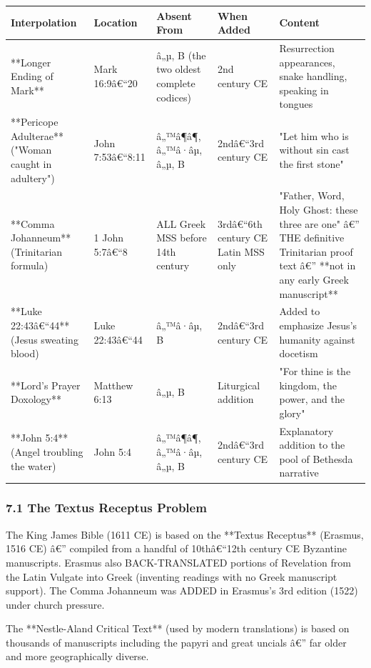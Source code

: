\documentclass[aps,prd,11pt,onecolumn,superscriptaddress,nofootinbib,floatfix]{revtex4-2}
\begin{document}
\begin{table}[h!]
\centering
\begin{tabular}{p{3cm}p{3cm}p{3cm}p{3cm}p{3cm}}
\hline
Interpolation & Location & Absent From & When Added & Content \\
\hline
**Longer Ending of Mark** & Mark 16:9â€``20 & â„µ, B (the two oldest complete codices) & 2nd century CE & Resurrection appearances, snake handling, speaking in tongues \\
**Pericope Adulterae** ("Woman caught in adultery") & John 7:53â€``8:11 & â„™â¶â¶, â„™â·âµ, â„µ, B & 2ndâ€``3rd century CE & "Let him who is without sin cast the first stone" \\
**Comma Johanneum** (Trinitarian formula) & 1 John 5:7â€``8 & ALL Greek MSS before 14th century & 3rdâ€``6th century CE Latin MSS only & "Father, Word, Holy Ghost: these three are one" â€'' THE definitive Trinitarian proof text â€'' **not in any early Greek manuscript** \\
**Luke 22:43â€``44** (Jesus sweating blood) & Luke 22:43â€``44 & â„™â·âµ, B & 2ndâ€``3rd century CE & Added to emphasize Jesus's humanity against docetism \\
**Lord's Prayer Doxology** & Matthew 6:13 & â„µ, B & Liturgical addition & "For thine is the kingdom, the power, and the glory" \\
**John 5:4** (Angel troubling the water) & John 5:4 & â„™â¶â¶, â„™â·âµ, â„µ, B & 2ndâ€``3rd century CE & Explanatory addition to the pool of Bethesda narrative \\
\hline
\end{tabular}
\end{table}



\subsubsection{7.1 The Textus Receptus Problem}


The King James Bible (1611 CE) is based on the **Textus Receptus** (Erasmus, 1516 CE) â€'' compiled from a handful of 10thâ€``12th century CE Byzantine manuscripts. Erasmus also BACK-TRANSLATED portions of Revelation from the Latin Vulgate into Greek (inventing readings with no Greek manuscript support). The Comma Johanneum was ADDED in Erasmus's 3rd edition (1522) under church pressure.


The **Nestle-Aland Critical Text** (used by modern translations) is based on thousands of manuscripts including the papyri and great uncials â€'' far older and more geographically diverse.
\end{document}
